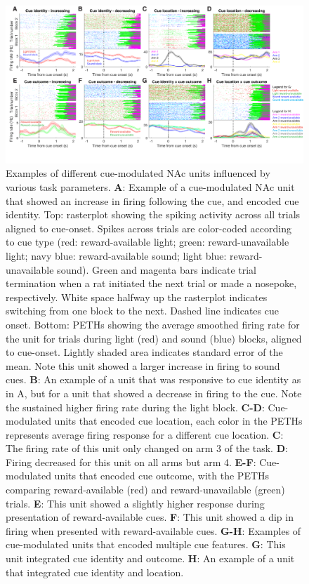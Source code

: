 \documentclass[11pt]{article}
\newcommand{\bsf}[1]{\textbf{#1}}
\begin{document}
{\begin{figure}[h]
\centering
\includegraphics[width=\textwidth]{Fig 5 - Neural examples.png}
\caption{Examples of different cue-modulated NAc units influenced by various
  task parameters. \bsf{A}: Example of a cue-modulated NAc unit that showed an
  increase in firing following the cue, and encoded cue identity. Top:
  rasterplot showing the spiking activity across all trials aligned to
  cue-onset. Spikes across trials are color-coded according to cue type (red:
  reward-available light; green: reward-unavailable light; navy blue:
  reward-available sound; light blue: reward-unavailable sound). Green and
  magenta bars indicate trial termination when a rat initiated the next trial or
  made a nosepoke, respectively. White space halfway up the rasterplot indicates
  switching from one block to the next. Dashed line indicates cue onset. Bottom:
  PETHs showing the average smoothed firing rate for the unit for trials during
  light (red) and sound (blue) blocks, aligned to cue-onset. Lightly shaded area
  indicates standard error of the mean. Note this unit showed a larger increase
  in firing to sound cues. \bsf{B}: An example of a unit that was responsive to
  cue identity as in A, but for a unit that showed a decrease in firing to the
  cue. Note the sustained higher firing rate during the light block. \bsf{C-D}:
  Cue-modulated units that encoded cue location, each color in the PETHs
  represents average firing response for a different cue location. \bsf{C}: The
  firing rate of this unit only changed on arm 3 of the task. \bsf{D}: Firing
  decreased for this unit on all arms but arm 4. \bsf{E-F}: Cue-modulated units
  that encoded cue outcome, with the PETHs comparing reward-available (red) and
  reward-unavailable (green) trials. \bsf{E}: This unit showed a slightly higher
  response during presentation of reward-available cues. \bsf{F}: This unit
  showed a dip in firing when presented with reward-available cues. \bsf{G-H}:
  Examples of cue-modulated units that encoded multiple cue features. \bsf{G}:
  This unit integrated cue identity and outcome. \bsf{H}: An example of a unit
  that integrated cue identity and location.}
\label{fig:examples}
\end{figure}

}
\end{document}
